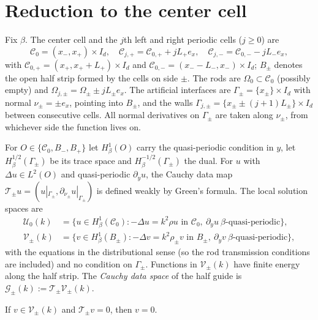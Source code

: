 \section{Reduction to the center cell}\label{sec:reduction}

Fix $\beta$. The center cell and the $j$th left and right periodic cells
($j\ge0$) are
\[
  \mathcal C_0=(x_-,x_+)\times I_d,\quad
  \mathcal C_{j,+}=\mathcal C_{0,+}+jL_+e_x,\quad
  \mathcal C_{j,-}=\mathcal C_{0,-}-jL_-e_x,
\]
with $\mathcal C_{0,+}=(x_+,x_++L_+)\times I_d$ and
$\mathcal C_{0,-}=(x_--L_-,x_-)\times I_d$; $B_\pm$ denotes the open half
strip formed by the cells on side $\pm$. The rods are $\Omega_0\subset\mathcal C_0$
(possibly empty) and $\Omega_{j,\pm}=\Omega_\pm\pm jL_\pm e_x$. The artificial
interfaces are $\Gamma_\pm=\{x_\pm\}\times I_d$ with normal $\nu_\pm=\pm e_x$,
pointing into $B_\pm$, and the walls $\Gamma_{j,\pm}=\{x_\pm\pm(j+1)L_\pm\}\times
I_d$ between consecutive cells. All normal derivatives on $\Gamma_\pm$ are taken
along $\nu_\pm$, from whichever side the function lives on.

For $O\in\{\mathcal C_0,B_-,B_+\}$ let $H^1_\beta(O)$ carry the quasi-periodic
condition in $y$, let $H^{1/2}_\beta(\Gamma_\pm)$ be its trace space and
$H^{-1/2}_\beta(\Gamma_\pm)$ the dual. For $u$ with $\Delta u\in L^2(O)$ and
quasi-periodic $\partial_yu$, the Cauchy data map
$\mathscr T_\pm u=(u|_{\Gamma_\pm},\partial_{\nu_\pm}u|_{\Gamma_\pm})$ is
defined weakly by Green's formula. The local solution spaces are
\begin{align*}
  \mathcal U_0(k)&=\{u\in H^1_\beta(\mathcal C_0):-\Delta u=k^2\rho u
  \text{ in }\mathcal C_0,\ \partial_yu\ \beta\text{-quasi-periodic}\},\\
  \mathcal V_\pm(k)&=\{v\in H^1_\beta(B_\pm):-\Delta v=k^2\rho_\pm v
  \text{ in }B_\pm,\ \partial_yv\ \beta\text{-quasi-periodic}\},
\end{align*}
with the equations in the distributional sense (so the rod transmission
conditions are included) and no condition on $\Gamma_\pm$. Functions in
$\mathcal V_\pm(k)$ have finite energy along the half strip. The
\emph{Cauchy data space} of the half guide is
$\mathcal G_\pm(k):=\mathscr T_\pm\mathcal V_\pm(k)$.

\begin{lemma}\label{lem:uc}
If $v\in\mathcal V_\pm(k)$ and $\mathscr T_\pm v=0$, then $v=0$.
\end{lemma}

